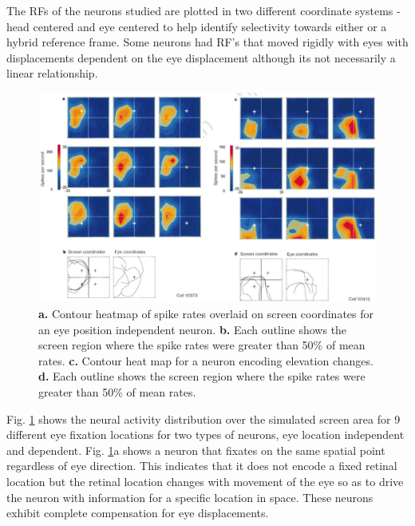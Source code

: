 \documentclass[10pt,oneside,final]{article}
\begin{document}
        The RFs of the neurons studied are plotted in two different coordinate systems - head centered and eye centered to help identify selectivity towards either or a hybrid reference frame. Some neurons had RF's that moved rigidly with eyes with displacements dependent on the eye displacement although its not necessarily a linear relationship. 
        \begin{figure}[h!]
            \centering
            \includegraphics[width=\textwidth]{duh_contour.png}
            \caption{\textbf{a.} Contour heatmap of spike rates overlaid on screen coordinates for an eye position independent neuron. \textbf{b.} Each outline shows the screen region where the spike rates were greater than 50\% of mean rates. \textbf{c.} Contour heat map for a neuron encoding elevation changes. \textbf{d.} Each outline shows the screen region where the spike rates were greater than 50\% of mean rates. \cite{Duhamel1997}}
            \label{fig:duh_cont}
        \end{figure}

        Fig. \ref{fig:duh_cont} shows the neural activity distribution over the simulated screen area for 9 different eye fixation locations for two types of neurons, eye location independent and dependent. Fig. \ref{fig:duh_cont}a shows a neuron that fixates on the same spatial point regardless of eye direction. This indicates that it does not encode a fixed retinal location but the retinal location changes with movement of the eye so as to drive the neuron with information for a specific location in space. These neurons exhibit complete compensation for eye displacements. 
\end{document}
